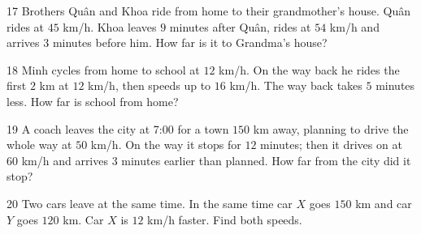 \gap
\begin{probbox}{17}{\relax}
Brothers Quân and Khoa ride from home to their grandmother's house. Quân rides at $45$ km/h. Khoa leaves $9$ minutes after Quân, rides at $54$ km/h and arrives $3$ minutes before him. How far is it to Grandma's house?
\end{probbox}
\gap
\begin{probbox}{18}{\relax}
Minh cycles from home to school at $12$ km/h. On the way back he rides the first $2$ km at $12$ km/h, then speeds up to $16$ km/h. The way back takes $5$ minutes less. How far is school from home?
\end{probbox}
\gap
\begin{probbox}{19}{\relax}
A coach leaves the city at 7:00 for a town $150$ km away, planning to drive the whole way at $50$ km/h. On the way it stops for $12$ minutes; then it drives on at $60$ km/h and arrives $3$ minutes earlier than planned. How far from the city did it stop?
\end{probbox}
\gap
\begin{probbox}{20}{\relax}
Two cars leave at the same time. In the same time car $X$ goes $150$ km and car $Y$ goes $120$ km. Car $X$ is $12$ km/h faster. Find both speeds.
\end{probbox}
